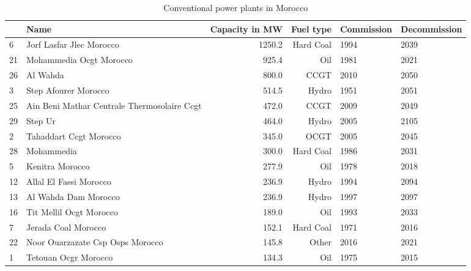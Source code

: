 \begin{table}
\centering
\caption{Conventional power plants in Morocco}
\label{tab:powerplants}
\begin{tabular}{p{1cm}p{6.5cm}rrp{2cm}p{3.4cm}}
\toprule
{} &                                         Name &  Capacity in MW &  Fuel type &  Commission &  Decommission \\
\midrule
6  &                     Jorf Lasfar Jlec Morocco &          1250.2 &  Hard Coal &        1994 &          2039 \\
21 &                      Mohammedia Ocgt Morocco &           925.4 &        Oil &        1981 &          2021 \\
26 &                                     Al Wahda &           800.0 &       CCGT &        2010 &          2050 \\
3  &                         Step Afourer Morocco &           514.5 &      Hydro &        1951 &          2051 \\
25 &  Ain Beni Mathar Centrale Thermosolaire Ccgt &           472.0 &       CCGT &        2009 &          2049 \\
29 &                                      Step Ur &           464.0 &      Hydro &        2005 &          2105 \\
2  &                       Tahaddart Ccgt Morocco &           345.0 &       OCGT &        2005 &          2045 \\
28 &                                   Mohammedia &           300.0 &  Hard Coal &        1986 &          2031 \\
5  &                              Kenitra Morocco &           277.9 &        Oil &        1978 &          2018 \\
12 &                       Allal El Fassi Morocco &           236.9 &      Hydro &        1994 &          2094 \\
13 &                         Al Wahda Dam Morocco &           236.9 &      Hydro &        1997 &          2097 \\
16 &                      Tit Mellil Ocgt Morocco &           189.0 &        Oil &        1993 &          2033 \\
7  &                          Jerada Coal Morocco &           152.1 &  Hard Coal &        1971 &          2016 \\
22 &             Noor Ouarzazate Csp Osps Morocco &           145.8 &      Other &        2016 &          2021 \\
1  &                         Tetouan Ocgr Morocco &           134.3 &        Oil &        1975 &          2015 \\

\end{tabular}
\end{table}
